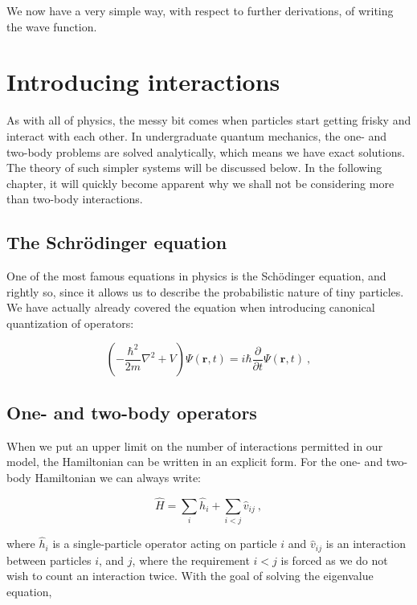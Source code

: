 \documentclass[10pt,twoside]{report}
\begin{document}
	We now have a very simple way, with respect to further derivations, of writing the wave function. 
	
	\section{Introducing interactions}
	As with all of physics, the messy bit comes when particles start getting frisky and interact with each other. In undergraduate quantum mechanics, the one- and two-body problems are solved analytically, which means we have exact solutions. The theory of such simpler systems will be discussed below. In the following chapter, it will quickly become apparent why we shall not be considering more than two-body interactions.
	
	\subsection{The Schr\"odinger equation}
	One of the most famous equations in physics is the Sch\"odinger equation, and rightly so, since it allows us to describe the probabilistic nature of tiny particles. We have actually already covered the equation when introducing canonical quantization of operators:
	
	\begin{equation}
		\left(-\frac{\hbar^2}{2m}\nabla^2 + V\right)\Psi(\bm{r},t) = i\hbar\frac{\partial}{\partial t}\Psi(\bm{r},t) \:,
	\end{equation}
	
	\subsection{One- and two-body operators}
	When we put an upper limit on the number of interactions permitted in our model, the Hamiltonian can be written in an explicit form. For the one- and two-body Hamiltonian we can always write:
	
	\begin{equation}
		\hat{H} = \sum_i \hat{h}_i + \sum_{i<j} \hat{v}_{ij} \:,
		\label{MBQM | eq | "simple hamiltonian"}
	\end{equation}
	
	\noindent where $\hat{h}_i$ is a single-particle operator acting on particle $i$ and $\hat{v}_{ij}$ is an interaction between particles $i$, and $j$, where the requirement $i<j$ is forced as we do not wish to count an interaction twice. With the goal of solving the eigenvalue equation,
	
\end{document}
